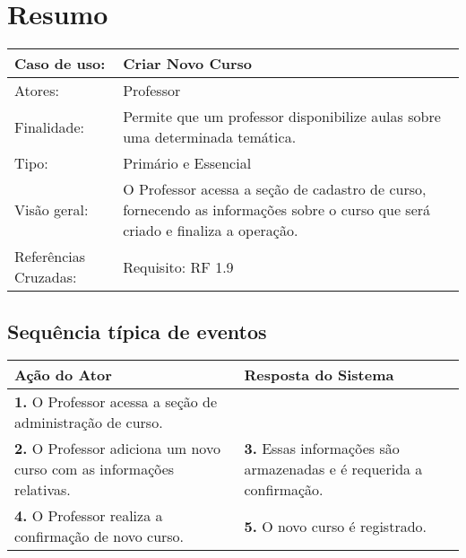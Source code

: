 \documentclass[12pt,a4paper,onecolumn,titlepage]{article}
\begin{document}
\section{Resumo}
\begin{table}[h!]
\begin{center}
\begin{tabular}{p{2.5cm} p{9.5cm}}
Caso de uso: & \textbf{Criar Novo Curso} \\ \hline
Atores: & Professor \\ \hline
Finalidade: & Permite que um professor disponibilize aulas sobre uma determinada temática. \\ \hline
Tipo: & Primário e Essencial\\ \hline
Visão geral: & O Professor acessa a seção de cadastro de curso, fornecendo as informações sobre o curso que será criado e finaliza a operação. \\ \hline
Referências Cruzadas: & Requisito: RF 1.9

\end{tabular}
\end{center}
\end{table}


\subsection{Sequência típica de eventos}
\begin{center}
\def\arraystretch{1.1}
\begin{tabular}{|p{6cm}|p{6cm}|}

\hline
\textbf{Ação do Ator} & \textbf{Resposta do Sistema} \\ \hline
\textbf{1.} O Professor acessa a seção de administração de curso. &  \\ \hline
\textbf{2.} O Professor adiciona um novo curso com as informações relativas. & \textbf{3.} Essas informações são armazenadas e é requerida a confirmação. \\ \hline
\textbf{4.} O Professor realiza a confirmação de novo curso. & \textbf{5.} O novo curso é registrado. \\ \hline
\end{tabular}
\end{center}

\newpage
\end{document}
